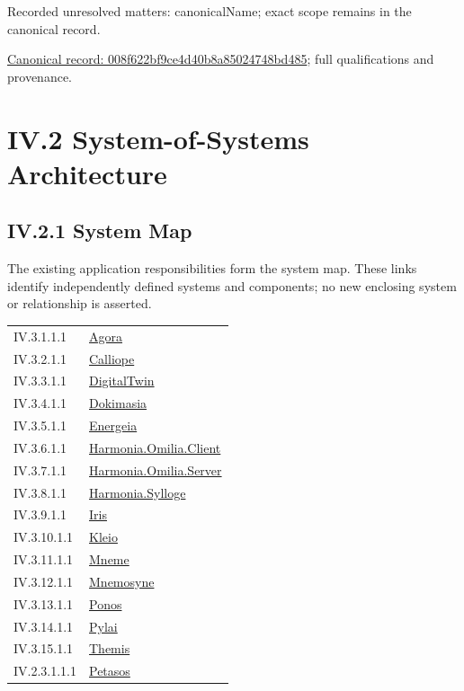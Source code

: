 {\small Recorded unresolved matters: canonicalName; exact scope remains in the canonical record.}\par
{\footnotesize \href{../../../../continuum/application/data-object/008f622bf9ce4d40b8a85024748bd485.md}{Canonical record: 008f622bf9ce4d40b8a85024748bd485}; full qualifications and provenance.}\par
\chapter*{IV.2 System-of-Systems Architecture}
\label{navigation:IV.2}

\section*{IV.2.1 System Map}
\label{navigation:IV.2.1}

The existing application responsibilities form the system map. These links identify independently defined systems and components; no new enclosing system or relationship is asserted.\par
\begin{longtable}{p{.22\linewidth}p{.73\linewidth}}
IV.3.1.1.1 & \hyperref[element:d1c4053e68384080b8eb79d2008632ba]{Agora} \\
IV.3.2.1.1 & \hyperref[element:466ad8f75a954c0581b5bba090443849]{Calliope} \\
IV.3.3.1.1 & \hyperref[element:3f64d339648246e99e8866c8089f8960]{DigitalTwin} \\
IV.3.4.1.1 & \hyperref[element:d739c75dffe2453081735710b285f03b]{Dokimasia} \\
IV.3.5.1.1 & \hyperref[element:fb3f37a6ac614415ac486a6de9d35994]{Energeia} \\
IV.3.6.1.1 & \hyperref[element:33b8421ffc444b78b2d059201a58a688]{Harmonia.Omilia.Client} \\
IV.3.7.1.1 & \hyperref[element:369907025d06492bb414a72cea834a77]{Harmonia.Omilia.Server} \\
IV.3.8.1.1 & \hyperref[element:feea742463b84021b66853d287d8916f]{Harmonia.Sylloge} \\
IV.3.9.1.1 & \hyperref[element:e927c1af96c64fcd979be659bee2cbe3]{Iris} \\
IV.3.10.1.1 & \hyperref[element:fefda110e2274884ad58906733606efd]{Kleio} \\
IV.3.11.1.1 & \hyperref[element:1af8a56358f7429fabfb57be66542a99]{Mneme} \\
IV.3.12.1.1 & \hyperref[element:7985e647bf9e4ca3ba70faf9e3e4ae02]{Mnemosyne} \\
IV.3.13.1.1 & \hyperref[element:b521762c1ea444b48cd5f66be3752d30]{Ponos} \\
IV.3.14.1.1 & \hyperref[element:e3e4147fea3640198dc251ed41ee854d]{Pylai} \\
IV.3.15.1.1 & \hyperref[element:899d34ec491948b68aad09e507dea6d1]{Themis} \\
IV.2.3.1.1.1 & \hyperref[element:195e5f10db8e419391354197b5d7a8cc]{Petasos} \\
\end{longtable}
